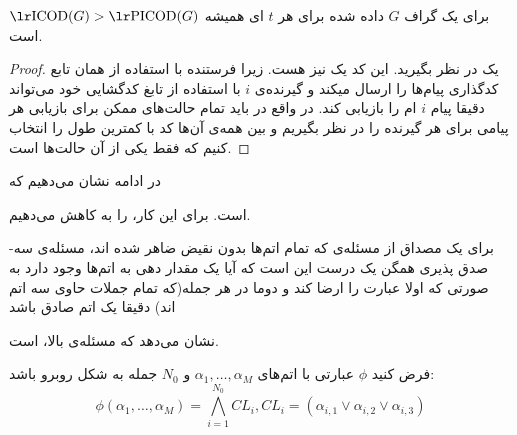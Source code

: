 \begin{lemma}
برای یک گراف
$G$
داده شده برای هر
$t$
ای همیشه
 $\text{\icodg} > \text{\picodg}$
 است.
 \cite{pliablefirstpaper}
\end{lemma}
\begin{proof}
	یک 
	\icod
	در نظر بگیرید. این کد یک
	\picod
	نیز هست. زیرا فرستنده با استفاده از همان تابع کدگذاری پیام‌ها را ارسال میکند و گیرنده‌ی
	$i$
	با استفاده از تابغ کدگشایی خود می‌تواند دقیقا	 پیام
	$i$
	ام را بازیابی کند. در واقع در
	\picod
	باید تمام حالت‌های ممکن برای بازیابی هر پیامی برای هر گیرنده را در نظر بگیریم و بین همه‌ی آن‌ها کد با کمترین طول را انتخاب کنیم که 
	\icod
	فقط یکی از آن حالت‌ها است.
\end{proof}

در ادامه نشان می‌دهیم که

\nphard
است. برای این کار، 
\lpicod
 را به
کاهش می‌دهیم.

\begin{definition}
	برای یک مصداق از مسئله‌ی 
که تمام اتم‌ها بدون نقیض ضاهر شده اند، مسئله‌ی سه-صدق پذیری همگن یک درست این است که آیا یک مقدار دهی به اتم‌ها وجود دارد به صورتی که اولا عبارت را ارضا کند و دوما در هر جمله(که تمام جملات حاوی سه اتم اند) دقیقا یک اتم صادق باشد
\end{definition}

\cite{10.1145/800133.804350}
نشان می‌دهد که مسئله‌ی بالا، 
\nphard
است.

فرض کنید
$\phi$
عبارتی با اتم‌های
$\alpha_1, \ldots, \alpha_M$
و
$N_0$
جمله به شکل روبرو باشد:
$$\phi(\alpha_1, \ldots, \alpha_M) = \bigwedge\limits_{i = 1}^{N_0} CL_i, CL_i = (\alpha_{i, 1} \vee \alpha_{i, 2} \vee \alpha_{i, 3})$$

